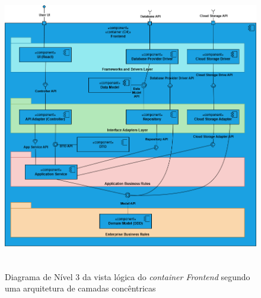 \begin{figure}[H]
    \centering
    \includegraphics[height=5in,keepaspectratio]{frontmatter/assets/diagrams/AlternativeModel.drawio.png}
    \caption{Diagrama de Nível 3 da vista lógica do \textit{container Frontend} segundo uma arquitetura de camadas concêntricas}
    \label{fig:alternativeModel}
\end{figure}